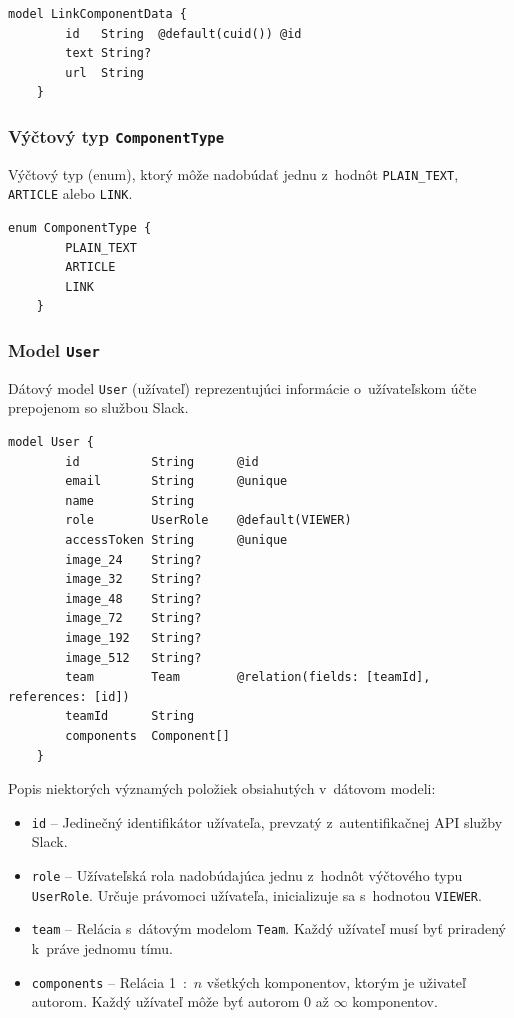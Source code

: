 \begin{lstlisting}[language={Prisma}, caption=Dátový model \texttt{LinkComponentData} v~konfiguračnom súbore \texttt{prisma}.]
	model LinkComponentData {
		id   String  @default(cuid()) @id
		text String?
		url  String
	}
\end{lstlisting}

\subsubsection{Výčtový typ \texttt{ComponentType}}
Výčtový typ (enum), ktorý môže nadobúdať jednu z~hodnôt \texttt{PLAIN\_TEXT}, \texttt{ARTICLE} alebo \texttt{LINK}. \\

\begin{lstlisting}[language={Prisma}, caption=Výčtový typ \texttt{ComponentType} v~konfiguračnom súbore \texttt{prisma}.]
	enum ComponentType {
		PLAIN_TEXT
		ARTICLE
		LINK
	}
\end{lstlisting}

\subsubsection{Model \texttt{User}}
Dátový model \texttt{User} (užívateľ) reprezentujúci informácie o~užívateľskom účte prepojenom so službou Slack. \\

\begin{lstlisting}[language={Prisma}, caption=Dátový model \texttt{User} v~konfiguračnom súbore \texttt{prisma}.]
	model User {
		id          String      @id
		email       String      @unique
		name        String
		role        UserRole    @default(VIEWER)
		accessToken String      @unique
		image_24    String?
		image_32    String?
		image_48    String?
		image_72    String?
		image_192   String?
		image_512   String?
		team        Team        @relation(fields: [teamId], references: [id])
		teamId      String
		components  Component[]
	}
\end{lstlisting}

\medskip

\noindent Popis niektorých významých položiek obsiahutých v~dátovom modeli:

\begin{itemize}
	\item \texttt{id} -- Jedinečný identifikátor užívateľa, prevzatý z~autentifikačnej API služby Slack.
	\item \texttt{role} -- Užívateľská rola nadobúdajúca jednu z~hodnôt výčtového typu \texttt{UserRole}. Určuje právomoci užívateľa, inicializuje sa s~hodnotou \texttt{VIEWER}.
	\item \texttt{team} -- Relácia s~dátovým modelom \texttt{Team}. Každý užívateľ musí byť priradený k~práve jednomu tímu.
	\item \texttt{components} -- Relácia 1~:~$n$ všetkých komponentov, ktorým je uživateľ autorom. Každý užívateľ môže byť autorom 0 až $\infty$ komponentov.
\end{itemize}

